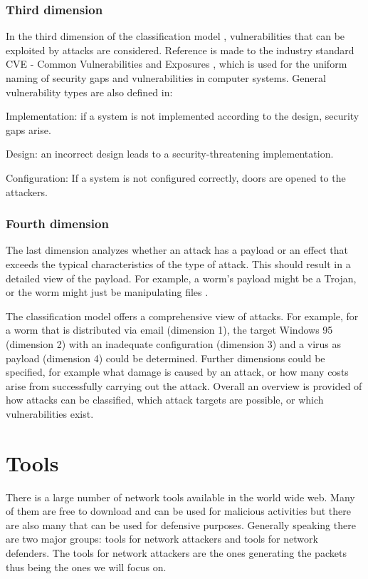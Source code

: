 \documentclass[conference]{IEEEtran}
\begin{document}
\medskip \subsubsection{Third dimension}In the third dimension of the classification model \cite{b5}, vulnerabilities that can be exploited by attacks are considered. Reference is made to the industry standard CVE - Common Vulnerabilities and Exposures \cite{b7}, which is used for the uniform naming of security gaps and vulnerabilities in computer systems. General vulnerability types are also defined in\cite{b8}:

\smallskip Implementation: if a system is not implemented according to the design, security gaps arise.

\smallskip Design: an incorrect design leads to a security-threatening implementation.

\smallskip Configuration: If a system is not configured correctly, doors are opened to the attackers.

\medskip \subsubsection{Fourth dimension}The last dimension analyzes whether an attack has a payload or an effect that exceeds the typical characteristics of the type of attack. This should result in a detailed view of the payload. For example, a worm's payload might be a Trojan, or the worm might just be manipulating files \cite{b5}.

\medskip The classification model offers a comprehensive view of attacks. For example, for a worm that is distributed via email (dimension 1), the target Windows 95 (dimension 2) with an inadequate configuration (dimension 3) and a virus as payload (dimension 4) could be determined. Further dimensions could be specified, for example what damage is caused by an attack, or how many costs arise from successfully carrying out the attack. Overall an overview is provided of how attacks can be classified, which attack targets are possible, or which vulnerabilities exist.


\section{Tools}

There is a large number of network tools available in the world wide web. Many of them are free to download and can be used for malicious activities but there are also many that can be used for defensive purposes. Generally speaking there are two major groups: tools for network attackers and tools for network defenders.\cite{b1} The tools for network attackers are the ones generating the packets thus being the ones we will focus on. 
\end{document}
